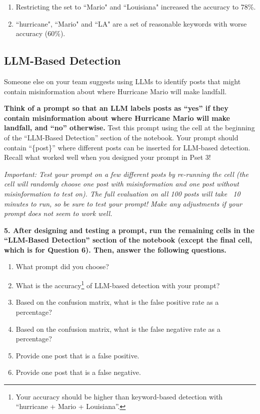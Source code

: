 \documentclass{article}
\begin{document}
\bigskip
\begin{mdframed}
\begin{enumerate}[label=\Alph*.]
    \item Restricting the set to ``Mario" and ``Louisiana" increased the accuracy to 78\%.
    \item ``hurricane", ``Mario" and ``LA" are a set of reasonable keywords with worse accuracy (60\%).
\end{enumerate}
\end{mdframed}
\bigskip

\subsection*{LLM-Based Detection}

Someone else on your team suggests using LLMs to identify posts that might contain misinformation about where Hurricane Mario will make landfall. 

\textbf{Think of a prompt so that an LLM labels posts as ``yes'' if they contain misinformation about where Hurricane Mario will make landfall, and ``no'' otherwise.} Test this prompt using the cell at the beginning of the ``LLM-Based Detection'' section of the notebook. Your prompt should contain ``\{post\}'' where different posts can be inserted for LLM-based detection. Recall what worked well when you designed your prompt in Pset 3!

\textit{Important: Test your prompt on a few different posts by re-running the cell (the cell will randomly choose one post with misinformation and one post without misinformation to test on). The full evaluation on all 100 posts will take ~10 minutes to run, so be sure to test your prompt! Make any adjustments if your prompt does not seem to work well.}

\textbf{5. After designing and testing a prompt, run the remaining cells in the ``LLM-Based Detection'' section of the notebook (except the final cell, which is for Question 6). Then, answer the following questions.}
\begin{enumerate}[label=\Alph*.]
    \item What prompt did you choose?
    \item What is the accuracy\footnote{Your accuracy should be higher than keyword-based detection with ``hurricane + Mario + Louisiana''.} of LLM-based detection with your prompt?
    \item Based on the confusion matrix, what is the false positive rate as a percentage?
    \item Based on the confusion matrix, what is the false negative rate as a percentage?
    \item Provide one post that is a false positive.
    \item Provide one post that is a false negative.
\end{enumerate}
\end{document}
